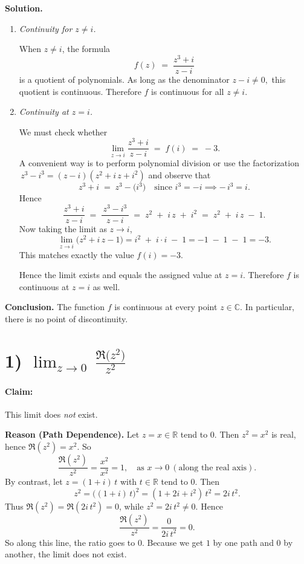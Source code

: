 \documentclass[12pt]{article}
\theoremstyle{definition} %
\theoremstyle{plain} %
\begin{document}
\noindent
\textbf{Solution.}
\begin{enumerate}
\item \emph{Continuity for \(z \neq i\).}

When \(z \neq i\), the formula 
\[
f(z) \;=\; \frac{z^3 + i}{\,z - i\,}
\]
is a quotient of polynomials.  As long as the denominator \(z - i \neq 0,\) this quotient is continuous.  Therefore \(f\) is continuous for all \(z \neq i\).

\item \emph{Continuity at \(z = i\).}

We must check whether
\[
\lim_{z \to i} \frac{z^3 + i}{\,z - i\,} \;=\; f(i) \;=\; -3.
\]
A convenient way is to perform polynomial division or use the factorization 
\(\,z^3 - i^3 = (z - i)(z^2 + i\,z + i^2)\) and observe that
\[
z^3 + i \;=\; z^3 - \bigl(i^3\bigr)
\quad\text{since } i^3 = -i \implies -\,i^3 = i.
\]
Hence
\[
\frac{z^3 + i}{\,z - i\,}
\;=\;
\frac{\,z^3 - i^3\,}{\,z - i\,}
\;=\;
z^2 \;+\; i\,z \;+\; i^2
\;=\;
z^2 \;+\; i\,z \;-\; 1.
\]
Now taking the limit as \(z \to i\),
\[
\lim_{z \to i} \bigl(z^2 + i\,z - 1\bigr)
= i^2 \;+\; i\cdot i \;-\; 1
= -1 \;-\;1 \;-\;1
= -3.
\]
This matches exactly the value \(f(i) = -3.\)

Hence the limit exists and equals the assigned value at \(z = i\).  Therefore \(f\) is continuous at \(z = i\) as well.

\end{enumerate}

\noindent
\textbf{Conclusion.}
The function \(f\) is continuous at every point \(z \in \mathbb{C}\).  In particular, there is no point of discontinuity.

\section*{1) \; $\displaystyle \lim_{z \to 0}\,\frac{\Re\bigl(z^2\bigr)}{z^2}$}

\paragraph{Claim:} This limit does \emph{not} exist.

\medskip
\noindent
\textbf{Reason (Path Dependence).}
Let $z = x \in \mathbb{R}$ tend to $0$.  
Then $z^2 = x^2$ is real, hence $\Re(z^2) = x^2$.  So
\[
\frac{\Re(z^2)}{z^2} 
= \frac{x^2}{x^2} 
= 1,
\quad \text{as }x \to 0 \ (\text{along the real axis}).
\]
By contrast, let $z = (1+i)\,t$ with $t \in \mathbb{R}$ tend to $0$.  
Then
\[
z^2 = \bigl((1+i)\,t\bigr)^2 
= (1 + 2i + i^2)\,t^2
= 2i\,t^2.
\]
Thus $\Re(z^2) = \Re(2i\,t^2)=0$, while $z^2 = 2i\,t^2 \neq 0$.  Hence 
\[
\frac{\Re(z^2)}{z^2}
= \frac{0}{2i\,t^2} 
= 0.
\]
So along this line, the ratio goes to $0$.  
Because we get $1$ by one path and $0$ by another, the limit does not exist.
\end{document}
